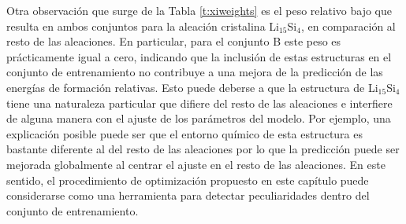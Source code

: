 Otra observación que surge de la Tabla \ref{t:xiweights} es el peso relativo bajo
que resulta en ambos conjuntos para la aleación cristalina Li$_{15}$Si$_4$, en 
comparación al resto de las aleaciones. En particular, para el conjunto B este 
peso es prácticamente igual a cero, indicando que la inclusión de estas 
estructuras en el conjunto de entrenamiento no contribuye a una mejora de la 
predicción de las energías de formación relativas. Esto puede deberse a que la 
estructura de Li$_{15}$Si$_4$ tiene una naturaleza particular que difiere del 
resto de las aleaciones e interfiere de alguna manera con el ajuste de los 
parámetros del modelo. Por ejemplo, una explicación posible puede ser que el 
entorno químico de esta estructura es bastante diferente al del resto de las 
aleaciones por lo que la predicción puede ser mejorada globalmente al centrar el 
ajuste en el resto de las aleaciones. En este sentido, el procedimiento de 
optimización propuesto en este capítulo puede considerarse como una herramienta 
para detectar peculiaridades dentro del conjunto de entrenamiento.
